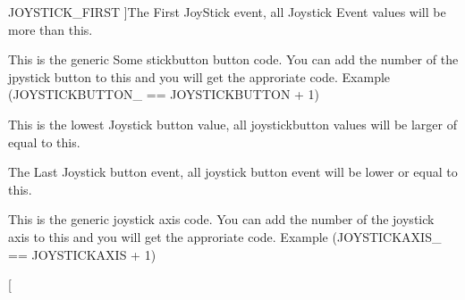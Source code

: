 \begin{Desc}
\begin{description}
{{JOYSTICK\_\-FIRST}
\label{classphys_1_1MetaCode_a3e501cbb5bf0f6f1fdb7211465bda8d8a666e564cae666de739b9b3cf047ec578}
}]The First JoyStick event, all Joystick Event values will be more than this. \item[{\em 
\hypertarget{classphys_1_1MetaCode_a3e501cbb5bf0f6f1fdb7211465bda8d8aaaa2af6a60a9cd7403aa4786ef1ea389}{
JOYSTICKBUTTON}
\label{classphys_1_1MetaCode_a3e501cbb5bf0f6f1fdb7211465bda8d8aaaa2af6a60a9cd7403aa4786ef1ea389}
}]This is the generic Some stickbutton button code. You can add the number of the jpystick button to this and you will get the approriate code. Example (JOYSTICKBUTTON\_ == JOYSTICKBUTTON + 1) \item[{\em 
\hypertarget{classphys_1_1MetaCode_a3e501cbb5bf0f6f1fdb7211465bda8d8a88e7d7302a93326fdcc2181f96dc878e}{
JOYSTICKBUTTON\_\-FIRST}
\label{classphys_1_1MetaCode_a3e501cbb5bf0f6f1fdb7211465bda8d8a88e7d7302a93326fdcc2181f96dc878e}
}]This is the lowest Joystick button value, all joystickbutton values will be larger of equal to this. \item[{\em 
\hypertarget{classphys_1_1MetaCode_a3e501cbb5bf0f6f1fdb7211465bda8d8a527375f3b27437b82cffd7c5fc2a14ac}{
JOYSTICKBUTTON\_\-LAST}
\label{classphys_1_1MetaCode_a3e501cbb5bf0f6f1fdb7211465bda8d8a527375f3b27437b82cffd7c5fc2a14ac}
}]The Last Joystick button event, all joystick button event will be lower or equal to this. \item[{\em 
\hypertarget{classphys_1_1MetaCode_a3e501cbb5bf0f6f1fdb7211465bda8d8ab4e0e44b1cad95e292e9e436f3e59e0a}{
JOYSTICKAXIS}
\label{classphys_1_1MetaCode_a3e501cbb5bf0f6f1fdb7211465bda8d8ab4e0e44b1cad95e292e9e436f3e59e0a}
}]This is the generic joystick axis code. You can add the number of the joystick axis to this and you will get the approriate code. Example (JOYSTICKAXIS\_ == JOYSTICKAXIS + 1) \item[{\em 
}
\end{description}
\end{Desc}
